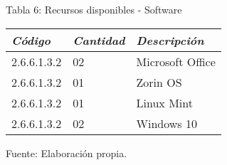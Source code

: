             \begin{table}[h!]
                \centering
                { Tabla 6: Recursos disponibles - Software}\par
                \begin{tabular}{|p{3cm}|p{2cm}|p{5cm}|} \hline
                    
                
                \textit{{\bf{Código}}} &
                \textit{{\bf{Cantidad}}} &
                \textit{{\bf{Descripción}}}
                \\ \hline

                2.6.6.1.3.2 &
                02 &
                Microsoft Office
                \\ \hline

                2.6.6.1.3.2 &
                01 &
                Zorin OS
                \\ \hline

                2.6.6.1.3.2 &
                01 &
                Linux Mint
                \\ \hline

                2.6.6.1.3.2 &
                02 &
                Windows 10
                \\ \hline

                \end{tabular}
                \begin{center}
                    \vskip -0.2cm
                    {\small{Fuente: Elaboración propia.}}
                \end{center}
            \end{table}

